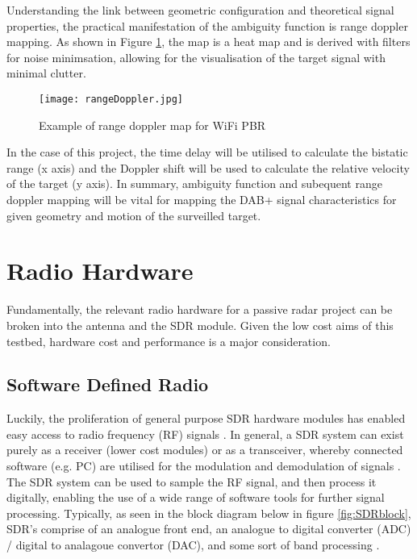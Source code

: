 \par \vspace{0.5cm} 
\noindent Understanding the link between geometric configuration and theoretical signal properties, the practical manifestation of the ambiguity function is range doppler mapping. As shown in Figure \ref{fig:rangeDoppler}, the map is a heat map and is derived with filters for noise minimsation, allowing for the visualisation of the target signal with minimal clutter. 

\begin{figure}[htbp]
    \centering
    \texttt{[image: rangeDoppler.jpg]}
    \caption{Example of range doppler map for WiFi PBR \cite{FundamentalsPassiveRadar}}
    \label{fig:rangeDoppler}
\end{figure}

\par  
\noindent In the case of this project, the time delay will be utilised to calculate the bistatic range (x axis) and the Doppler shift will be used to calculate the relative velocity of the target (y axis). In summary, ambiguity function and subequent range doppler mapping will be vital for mapping the DAB+ signal characteristics for given geometry and motion of the surveilled target. 



\section{Radio Hardware}
Fundamentally, the relevant radio hardware for a passive radar project can be broken into the antenna and the SDR module. Given the low cost aims of this testbed, hardware cost and performance is a major consideration. 

\subsection{Software Defined Radio \label{sec: SDRdongle}}
Luckily, the proliferation of general purpose SDR hardware modules has enabled easy access to radio frequency (RF) signals \cite{SDRtheory}. In general, a SDR system can exist purely as a receiver (lower cost modules) or as a transceiver, whereby connected software (e.g. PC) are utilised for the modulation and demodulation of signals \cite{SDRgeneralInfo}. The SDR system can be used to sample the RF signal, and then process it digitally, enabling the use of a wide range of software tools for further signal processing. Typically, as seen in the block diagram below in figure \ref{fig:SDRblock}, SDR's comprise of an analogue front end, an analogue to digital converter (ADC) / digital to analagoue convertor (DAC), and some sort of band processing \cite{SDRgeneralInfo}.

